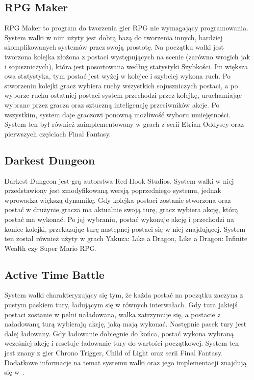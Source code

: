\documentclass{SGGW-thesis}
\begin{document}
\subsection{RPG Maker}
RPG Maker to program do tworzenia gier RPG nie wymagający programowania. System walki w nim użyty jest dobrą bazą do tworzenia innych, 
bardziej skomplikowanych systemów przez swoją prostotę. Na początku walki jest tworzona kolejka złożona z postaci występujących na scenie 
(zarówno wrogich jak i sojuszniczych), która jest posortowana według statystyki Szybkości. Im większa owa statystyka, tym postać jest wyżej w 
kolejce i szybciej wykona ruch. Po stworzeniu kolejki gracz wybiera ruchy wszystkich sojuszniczych postaci, a po wyborze ruchu ostatniej postaci
system przechodzi przez kolejkę, uruchamiając wybrane przez gracza oraz sztuczną inteligencję przeciwników akcje. Po wszystkim, 
system daje graczowi ponowną możliwość wyboru umiejętności. System ten był również zaimplementowany w grach z serii Etrian Oddysey oraz 
pierwszych częściach Final Fantasy.
\subsection{Darkest Dungeon}
Darkest Dungeon jest grą autorstwa Red Hook Studios. System walki w niej przedstawiony jest zmodyfikowaną wersją poprzedniego systemu, jednak wprowadza większą dynamikę. 
Gdy kolejka postaci zostanie stworzona oraz postać w drużynie gracza ma aktualnie swoją turę, gracz wybiera akcję, 
którą postać ma wykonać. Po jej wybraniu, postać wykonuje akcję i przechodzi na koniec kolejki, przekazując turę następnej postaci się w 
niej znajdującej. System ten został również użyty w grach Yakuza: Like a Dragon, Like a Dragon: Infinite Wealth czy Super Mario RPG.
\subsection{Active Time Battle}
System walki charakteryzujący się tym, że każda postać na początku zaczyna z pustym paskiem tury, ładującym się w równych interwałach. 
Gdy tura jakiejś postaci zostanie w pełni naładowana, walka zatrzymuje się, a postacie z naładowaną turą wybierają akcję, jaką mają wykonać. 
Następnie pasek tury jest dalej ładowany. Gdy ładowanie dobiegnie do końca, postać wykona wybraną wcześniej akcję i resetuje ładowanie tury 
do wartości początkowej. System ten jest znany z gier Chrono Trigger, Child of Light oraz serii Final Fantasy. Dodatkowe informacje na temat systemu walki oraz jego implementacji znajdują się w~\cite{ATB,PlayerPreferencesInRPGs}.
\end{document}
